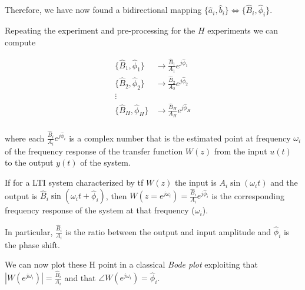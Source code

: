 Therefore, we have now found a bidirectional mapping $ \{ \hat{a}_i, \hat{b}_i \} \iff \{ \hat{B}_i, \hat{\phi}_i \}$.

Repeating the experiment and pre-processing for the $H$ experiments we can compute 

\begin{align*}
    \{ \hat{B}_1, \hat{\phi}_1 \} &\rightarrow \frac{\hat{B}_1}{A_1} e^{j\hat{\phi}_1} \\
    \{ \hat{B}_2, \hat{\phi}_2 \} &\rightarrow \frac{\hat{B}_2}{A_2} e^{j\hat{\phi}_2} \\
    \vdots& \\
    \{ \hat{B}_H, \hat{\phi}_H \} &\rightarrow \frac{\hat{B}_H}{A_H} e^{j\hat{\phi}_H} \\
\end{align*}

where each $\frac{\hat{B}_i}{A_i} e^{j\hat{\phi}_i}$ is a complex number that is the estimated point at frequency $\omega_i$ of the frequency response of the transfer function $W(z)$ from the input $u(t)$ to the output $y(t)$ of the system.

\begin{recall}
    If for a LTI system characterized by \gls{tf} $W(z)$ the input is $A_i \sin (\omega_i t)$ and the output is $\hat{B}_i \sin (\omega_i t + \hat{\phi}_i)$, then $W(z=e^{j \omega_i}) = \frac{\hat{B}_i}{A_i} e^{j\hat{\phi}_i}$ is the corresponding frequency response of the system at that frequency ($\omega_i$).
    
    In particular, $\frac{\hat{B}_i}{A_i}$ is the ratio between the output and input amplitude and $\hat{\phi}_i$ is the phase shift.
\end{recall}

We can now plot these H point in a classical \emph{Bode plot} exploiting that $|W(e^{j \omega_i})| = \frac{\hat{B}_i}{A_i}$ and that $\angle W(e^{j \omega_i}) = \hat{\phi}_i$.

\begin{figure}[H]
    \centering
\end{figure}

